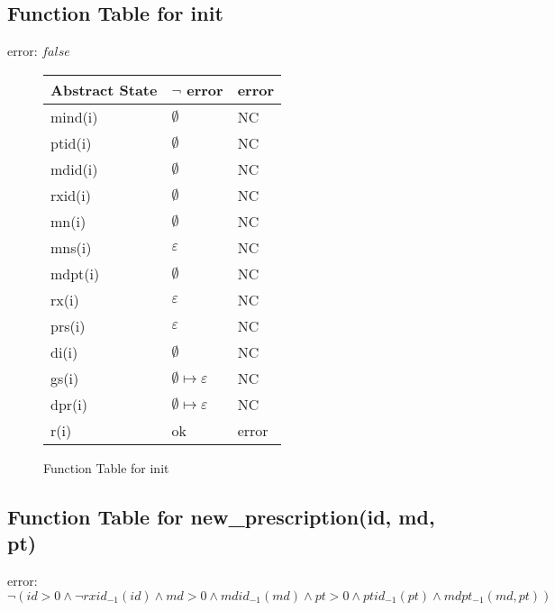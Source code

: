 \subsection{Function Table for init}

error: $false$

\begin{figure}[h]
\begin{center}

\begin{tabular}{|l|l|l|}
\hline
Abstract State & $\neg$ error & error \\ \hline
mind(i)        &   $\emptyset$      & NC    \\ \hline
ptid(i)        &       $\emptyset$    & NC    \\ \hline
mdid(i)        &    $\emptyset$       & NC    \\ \hline
rxid(i)        &      $\emptyset$     & NC    \\ \hline
mn(i)          &       $\emptyset$    & NC    \\ \hline
mns(i)         &   $ \varepsilon$       & NC    \\ \hline
mdpt(i)        &      $\emptyset$     & NC    \\ \hline
rx(i)          &    $ \varepsilon  $    & NC    \\ \hline
prs(i)         &   $ \varepsilon $      & NC    \\ \hline
di(i)          &     $\emptyset$      & NC    \\ \hline
gs(i)          &      $\emptyset \mapsto \varepsilon$     & NC    \\ \hline
dpr(i)         &       $\emptyset \mapsto \varepsilon $    & NC    \\ \hline
r(i)           & ok        & error \\ \hline
\end{tabular}

\caption{Function Table for init}
\label{ft-init}
\end{center}
\end{figure}

\newpage

\subsection{Function Table for new\_prescription(id, md, pt)}

error: $\neg (id > 0 \wedge \neg rxid_{-1}(id) \wedge md > 0  \wedge mdid_{-1}(md) \wedge pt > 0 \wedge ptid_{-1}(pt) \wedge mdpt_{-1}(md, pt))$


